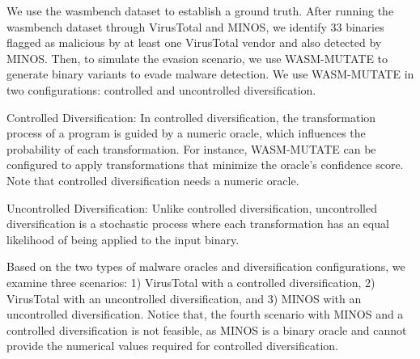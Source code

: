 We use the wasmbench dataset \cite{Hilbig2021AnES} to establish a ground truth. 
After running the wasmbench dataset through VirusTotal and MINOS, we identify 33 binaries flagged as malicious by at least one VirusTotal vendor and also detected by MINOS.
Then, to simulate the evasion scenario, we use WASM-MUTATE to generate \Wasm binary variants to evade malware detection.
We use WASM-MUTATE in two configurations: controlled and uncontrolled diversification.

\begin{definition}{Controlled Diversification:}
    \label{controlled_def}
    In controlled diversification, the transformation process of a \Wasm program is guided by a numeric oracle, which influences the probability of each transformation. For instance, WASM-MUTATE can be configured to apply transformations that minimize the oracle's confidence score. Note that controlled diversification needs a numeric oracle.
\end{definition}


\begin{definition}{Uncontrolled Diversification:}
    \label{uncontrolled_def}
    Unlike controlled diversification, uncontrolled diversification is a stochastic process where each transformation has an equal likelihood of being applied to the input \Wasm binary.
\end{definition}


Based on the two types of malware oracles and diversification configurations, we examine three scenarios:
1) VirusTotal with a controlled diversification, 2) VirusTotal with an uncontrolled diversification, and 3) MINOS with an uncontrolled diversification.
Notice that, the fourth scenario with MINOS and a controlled diversification is not feasible, as MINOS is a binary oracle and cannot provide the numerical values required for controlled diversification.

